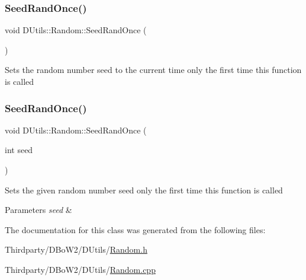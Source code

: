 \subsubsection{\texorpdfstring{Seed\+Rand\+Once()}{SeedRandOnce()}\hspace{0.1cm}{\footnotesize\ttfamily [1/2]}}
{\footnotesize\ttfamily void D\+Utils\+::\+Random\+::\+Seed\+Rand\+Once (\begin{DoxyParamCaption}{ }\end{DoxyParamCaption})\hspace{0.3cm}{\ttfamily [static]}}

Sets the random number seed to the current time only the first time this function is called \mbox{\label{class_d_utils_1_1_random_ad3652f5d105ca4f6f22696b64f2a4a5d}} 
\subsubsection{\texorpdfstring{Seed\+Rand\+Once()}{SeedRandOnce()}\hspace{0.1cm}{\footnotesize\ttfamily [2/2]}}
{\footnotesize\ttfamily void D\+Utils\+::\+Random\+::\+Seed\+Rand\+Once (\begin{DoxyParamCaption}\item[{int}]{seed }\end{DoxyParamCaption})\hspace{0.3cm}{\ttfamily [static]}}

Sets the given random number seed only the first time this function is called 
\begin{DoxyParams}{Parameters}
{\em seed} & \\
\hline
\end{DoxyParams}


The documentation for this class was generated from the following files\+:\begin{DoxyCompactItemize}
\item 
Thirdparty/\+D\+Bo\+W2/\+D\+Utils/\mbox{\hyperlink{_random_8h}{Random.\+h}}\item 
Thirdparty/\+D\+Bo\+W2/\+D\+Utils/\mbox{\hyperlink{_random_8cpp}{Random.\+cpp}}\end{DoxyCompactItemize}
